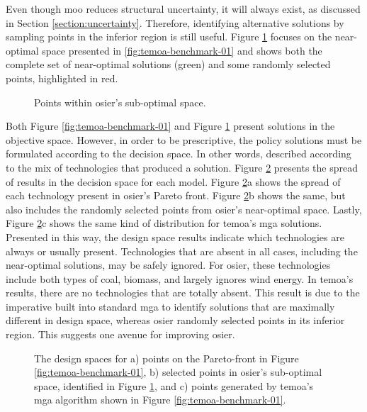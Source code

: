 Even though \ac{moo} reduces structural uncertainty, it will always exist, as
discussed in Section \ref{section:uncertainty}. Therefore, identifying
alternative solutions by sampling points in the inferior region is still useful.
Figure \ref{fig:temoa-benchmark-02} focuses on the near-optimal space presented
in \ref{fig:temoa-benchmark-01} and shows both the complete set of near-optimal
solutions (green) and some randomly selected points, highlighted in red.

\begin{figure}[h]
  \centering
  \resizebox{0.6\columnwidth}{!}{}
  \caption{Points within \ac{osier}'s sub-optimal space.}
  \label{fig:temoa-benchmark-02}
\end{figure}

Both Figure \ref{fig:temoa-benchmark-01} and Figure \ref{fig:temoa-benchmark-02}
present solutions in the objective space. However, in order to be prescriptive,
the policy solutions must be formulated according to the decision space. In
other words, described according to the mix of technologies that produced a
solution. Figure \ref{fig:temoa-benchmark-03} presents the spread of results in
the decision space for each model. Figure \ref{fig:temoa-benchmark-03}a shows
the spread of each technology present in \ac{osier}'s Pareto front. Figure
\ref{fig:temoa-benchmark-03}b shows the same, but also includes the randomly
selected points from \ac{osier}'s near-optimal space. Lastly, Figure
\ref{fig:temoa-benchmark-03}c shows the same kind of distribution for
\ac{temoa}'s \ac{mga} solutions. Presented in this way, the design space results
indicate which technologies are always or usually present. Technologies that are
absent in all cases, including the near-optimal solutions, may be safely
ignored. For \ac{osier}, these technologies include both types of coal, biomass,
and largely ignores wind energy. In \ac{temoa}'s results, there are no
technologies that are totally absent. This result is due to the imperative built
into standard \ac{mga} to identify solutions that are maximally different in
design space, whereas \ac{osier} randomly selected points in its inferior
region. This suggests one avenue for improving \ac{osier}.

\newpage
\begin{figure}[ht!]
  \centering
  \resizebox{\columnwidth}{!}{}
  \caption{The design spaces for a) points on the Pareto-front in Figure
  \ref{fig:temoa-benchmark-01}, b) selected points in \ac{osier}'s sub-optimal
  space, identified in Figure \ref{fig:temoa-benchmark-02}, and c) points
  generated by \ac{temoa}'s \ac{mga} algorithm shown in Figure
  \ref{fig:temoa-benchmark-01}.}
  \label{fig:temoa-benchmark-03}
\end{figure}

